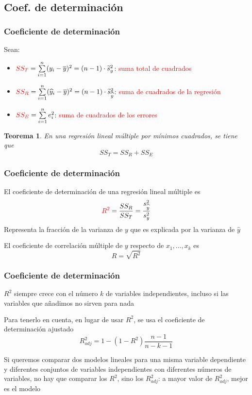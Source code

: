 \documentclass[12pt,t]{beamer}
\newcommand{\red}[1]{\textcolor{red}{#1}}
\renewcommand{\emph}[1]{{\color{red}#1}}
\theoremstyle{plain}
\newtheorem{teorema}{Teorema}
\theoremstyle{definition}
\begin{document}
\subsection{Coef. de determinación}
\begin{frame}
\frametitle{Coeficiente de determinación}
Sean:
\begin{itemize}
\item $\red{SS_T} =\sum\limits_{i=1}^n(y_i-\overline{y})^2=(n-1)\cdot \widetilde{s}_y^2$: \red{suma total de cuadrados}

\item $\red{SS_R}=\sum\limits_{i=1}^n(\widehat{y}_i-\overline{y})^2=(n-1)\cdot \widetilde{s}_{\widehat{y}}^2$: \red{suma de cuadrados de la regresión} 

\item $\red{SS_E}=\sum\limits_{i=1}^n e_i^2$: \red{suma de cuadrados de los errores}
\end{itemize}

\begin{teorema}
En una regresión lineal múltiple por mínimos cuadrados, se tiene que
$$
SS_T=SS_R+SS_E
$$
\end{teorema}
\end{frame}


\begin{frame}
\frametitle{Coeficiente de determinación}

El \emph{coeficiente de determinación} de una regresión lineal múltiple es
$$
\red{R^2}=\frac{SS_R}{SS_T}=\frac{s^2_{\widehat{y}}}{s^2_y}
$$
Representa la fracción de la varianza de $y$ que es explicada
por la varianza de $\widehat{y}$\medskip
\medskip

El \emph{coeficiente de correlación múltiple} de $y$ respecto de $x_1,\ldots, x_k$ es
$$
R=\sqrt{R^2}
$$
\end{frame}


\begin{frame}
\frametitle{Coeficiente de determinación}

$R^2$ siempre crece con el número $k$ de variables independientes, incluso si las variables que añadimos no sirven para nada
\medskip

Para tenerlo en cuenta, en lugar de usar
$R^2$,  se usa el \emph{coeficiente de determinación ajustado}
$$
R^2_{adj}=1-(1-R^2)\frac{n-1}{n-k-1}
$$

Si queremos comparar dos modelos lineales para una misma variable dependiente y diferentes conjuntos de variables independientes con diferentes números de variables, no hay que comparar los $R^2$, sino los $R^2_{adj}$: a mayor valor de $R^2_{adj}$, mejor es el modelo


\end{frame}
\end{document}

